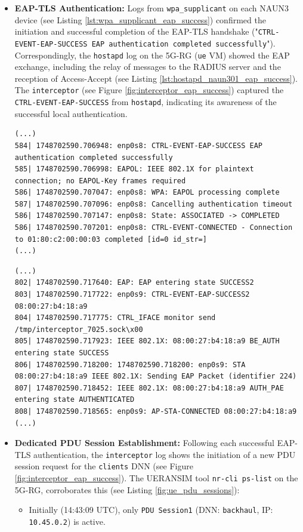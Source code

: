 \begin{itemize}
    \item \textbf{EAP-TLS Authentication:} Logs from \texttt{wpa\_supplicant} on each \ac{NAUN3} device (see Listing \ref{lst:wpa_supplicant_eap_success}) confirmed the initiation and successful completion of the \ac{EAP-TLS} handshake ("\texttt{CTRL-EVENT-EAP-SUCCESS EAP authentication completed successfully}"). Correspondingly, the \texttt{hostapd} log on the 5G-RG (\texttt{ue} \ac{VM}) showed the \ac{EAP} exchange, including the relay of messages to the \ac{RADIUS} server and the reception of Access-Accept (see Listing \ref{lst:hostapd_naun301_eap_success}). The \texttt{interceptor} (see Figure \ref{fig:interceptor_eap_success}) captured the \texttt{CTRL-EVENT-EAP-SUCCESS} from \texttt{hostapd}, indicating its awareness of the successful local authentication.

    \begin{lstlisting}[caption=wpa\_supplicant successful authentication,label={lst:wpa_supplicant_eap_success}]
(...)
584| 1748702590.706948: enp0s8: CTRL-EVENT-EAP-SUCCESS EAP authentication completed successfully
585| 1748702590.706998: EAPOL: IEEE 802.1X for plaintext connection; no EAPOL-Key frames required
586| 1748702590.707047: enp0s8: WPA: EAPOL processing complete
587| 1748702590.707096: enp0s8: Cancelling authentication timeout
586| 1748702590.707147: enp0s8: State: ASSOCIATED -> COMPLETED
586| 1748702590.707201: enp0s8: CTRL-EVENT-CONNECTED - Connection to 01:80:c2:00:00:03 completed [id=0 id_str=]
(...)
    \end{lstlisting}

    \begin{lstlisting}[caption=\texttt{hostapd} successful authentication,label={lst:hostapd_naun301_eap_success}]
(...)
802| 1748702590.717640: EAP: EAP entering state SUCCESS2
803| 1748702590.717722: enp0s9: CTRL-EVENT-EAP-SUCCESS2 08:00:27:b4:18:a9
804| 1748702590.717775: CTRL_IFACE monitor send /tmp/interceptor_7025.sock\x00
805| 1748702590.717923: IEEE 802.1X: 08:00:27:b4:18:a9 BE_AUTH entering state SUCCESS
806| 1748702590.718200: 1748702590.718200: enp0s9: STA 08:00:27:b4:18:a9 IEEE 802.1X: Sending EAP Packet (identifier 224)
807| 1748702590.718452: IEEE 802.1X: 08:00:27:b4:18:a9 AUTH_PAE entering state AUTHENTICATED
808| 1748702590.718565: enp0s9: AP-STA-CONNECTED 08:00:27:b4:18:a9
(...)
    \end{lstlisting}

    \item{
        \textbf{Dedicated \ac{PDU} Session Establishment:} Following each successful \ac{EAP-TLS} authentication, the \texttt{interceptor} log shows the initiation of a new \ac{PDU} session request for the \texttt{clients} \ac{DNN} (see Figure \ref{fig:interceptor_eap_success}). The UERANSIM tool \texttt{nr-cli ps-list} on the \ac{5G-RG}, corroborates this (see Listing \ref{fig:ue_pdu_sessions}):
        \begin{itemize}
            \item Initially (14:43:09 \ac{UTC}), only \texttt{PDU Session1} (\ac{DNN}: \texttt{backhaul}, \ac{IP}: \texttt{10.45.0.2}) is active.
            

\end{itemize}}
\end{itemize}
